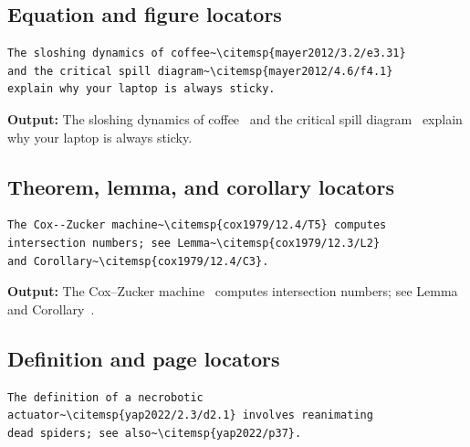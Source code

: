 \documentclass[11pt, a4paper]{article}
\begin{document}
\subsection{Equation and figure locators}

\begin{tcolorbox}[colback=blue!3, colframe=blue!30, boxrule=0.5pt, arc=2pt,
  top=6pt, bottom=6pt, left=10pt, right=10pt]
\begin{verbatim}
The sloshing dynamics of coffee~\citemsp{mayer2012/3.2/e3.31}
and the critical spill diagram~\citemsp{mayer2012/4.6/f4.1}
explain why your laptop is always sticky.
\end{verbatim}
\end{tcolorbox}

\noindent\textbf{Output:} The sloshing dynamics of
coffee~ and the critical spill
diagram~ explain why your laptop is
always sticky.


\subsection{Theorem, lemma, and corollary locators}

\begin{tcolorbox}[colback=blue!3, colframe=blue!30, boxrule=0.5pt, arc=2pt,
  top=6pt, bottom=6pt, left=10pt, right=10pt]
\begin{verbatim}
The Cox--Zucker machine~\citemsp{cox1979/12.4/T5} computes
intersection numbers; see Lemma~\citemsp{cox1979/12.3/L2}
and Corollary~\citemsp{cox1979/12.4/C3}.
\end{verbatim}
\end{tcolorbox}

\noindent\textbf{Output:} The Cox--Zucker
machine~ computes intersection numbers; see
Lemma~ and
Corollary~.


\subsection{Definition and page locators}

\begin{tcolorbox}[colback=blue!3, colframe=blue!30, boxrule=0.5pt, arc=2pt,
  top=6pt, bottom=6pt, left=10pt, right=10pt]
\begin{verbatim}
The definition of a necrobotic
actuator~\citemsp{yap2022/2.3/d2.1} involves reanimating
dead spiders; see also~\citemsp{yap2022/p37}.
\end{verbatim}
\end{tcolorbox}
\end{document}
